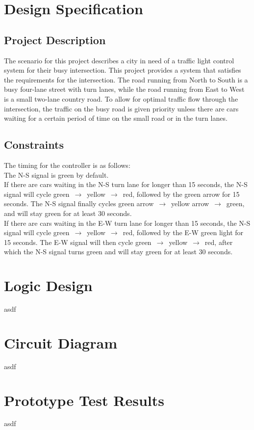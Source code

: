 \section{Design Specification}
\subsection{Project Description}
The scenario for this project describes a city in need of a traffic light control system for their busy intersection.
This project provides a system that satisfies the requirements for the intersection. The road running from North to South is a busy four-lane street with turn lanes,
while the road running from East to West is a small two-lane country road. To allow for optimal traffic flow through the intersection,
the traffic on the busy road is given priority unless there are cars waiting for a certain period of time on the small road or in the turn lanes.

\subsection{Constraints}
The timing for the controller is as follows:\\[1cm]
The N-S signal is green by default.\\[5mm]
If there are cars waiting in the N-S turn lane for longer than 15 seconds, the N-S signal will cycle green~$\rightarrow$~yellow~$\rightarrow$~red, followed by the green arrow for 15 seconds.
The N-S signal finally cycles green arrow~$\rightarrow$~yellow arrow~$\rightarrow$~green, and will stay green for at least 30 seconds.\\[5mm]
If there are cars waiting in the E-W turn lane for longer than 15 seconds, the N-S signal will cycle green~$\rightarrow$~yellow~$\rightarrow$~red, followed by the E-W green light for 15 seconds.
The E-W signal will then cycle green~$\rightarrow$~yellow~$\rightarrow$~red, after which the N-S signal turns green and will stay green for at least 30 seconds.

\section{Logic Design}
asdf

\section{Circuit Diagram}
asdf

\section{Prototype Test Results}
asdf
